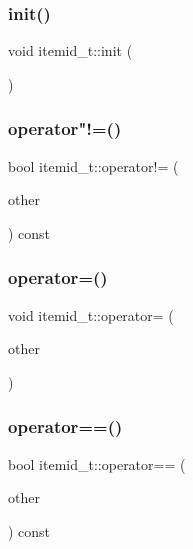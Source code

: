 \subsubsection{\texorpdfstring{init()}{init()}}
{\footnotesize\ttfamily void itemid\+\_\+t\+::init (\begin{DoxyParamCaption}{ }\end{DoxyParamCaption})}

\mbox{\label{classitemid__t_aff2ea20d977774ebe70edcc8425b3b76}} 
\subsubsection{\texorpdfstring{operator"!=()}{operator!=()}}
{\footnotesize\ttfamily bool itemid\+\_\+t\+::operator!= (\begin{DoxyParamCaption}\item[{const \hyperlink{classitemid__t}{itemid\+\_\+t} \&}]{other }\end{DoxyParamCaption}) const}

\mbox{\label{classitemid__t_a01c60be61379234e04de9925340951de}} 
\subsubsection{\texorpdfstring{operator=()}{operator=()}}
{\footnotesize\ttfamily void itemid\+\_\+t\+::operator= (\begin{DoxyParamCaption}\item[{const \hyperlink{classitemid__t}{itemid\+\_\+t} \&}]{other }\end{DoxyParamCaption})}

\mbox{\label{classitemid__t_ad0d24a7580d583b41c6bb415d731bd84}} 
\subsubsection{\texorpdfstring{operator==()}{operator==()}}
{\footnotesize\ttfamily bool itemid\+\_\+t\+::operator== (\begin{DoxyParamCaption}\item[{const \hyperlink{classitemid__t}{itemid\+\_\+t} \&}]{other }\end{DoxyParamCaption}) const}

